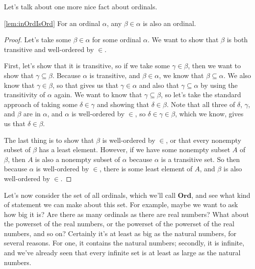 Let's talk about one more nice fact about ordinals.
\begin{lemma}\ref{lem:inOrdIsOrd}
    For an ordinal $\alpha$, any $\beta \in \alpha$ is also an ordinal.
\end{lemma}
\begin{proof}
    Let's take some $\beta \in \alpha$ for some ordinal $\alpha$.
    We want to show that $\beta$ is both transitive and well-ordered by $\in$.

    First, let's show that it is transitive, so if we take some $\gamma \in \beta$, then we want to show that $\gamma \subseteq \beta$.
    Because $\alpha$ is transitive, and $\beta \in \alpha$, we know that $\beta \subseteq \alpha$.
    We also know that $\gamma \in \beta$, so that gives us that $\gamma \in \alpha$ and also that $\gamma \subseteq \alpha$ by using the transitivity of $\alpha$ again.
    We want to know that $\gamma \subseteq \beta$, so let's take the standard approach of taking some $\delta \in \gamma$ and showing that $\delta \in \beta$.
    Note that all three of $\delta$, $\gamma$, and $\beta$ are in $\alpha$, and $\alpha$ is well-ordered by $\in$, so $\delta \in \gamma \in \beta$, which we know, gives us that $\delta \in \beta$.

    The last thing is to show that $\beta$ is well-ordered by $\in$, or that every nonempty subset of $\beta$ has a least element.
    However, if we have some nonempty subset $A$ of $\beta$, then $A$ is also a nonempty subset of $\alpha$ because $\alpha$ is a transitive set.
    So then because $\alpha$ is well-ordered by $\in$, there is some least element of $A$, and $\beta$ is also well-ordered by $\in$.
\end{proof}


Let's now consider the set of all ordinals, which we'll call $\bm{Ord}$, and see what kind of statement we can make about this set.
For example, maybe we want to ask how big it is?
Are there as many ordinals as there are real numbers?
What about the powerset of the real numbers, or the powerset of the powerset of the real numbers, and so on?
Certainly it's at least as big as the natural numbers, for several reasons.
For one, it contains the natural numbers; secondly, it is infinite, and we've already seen that every infinite set is at least as large as the natural numbers.

